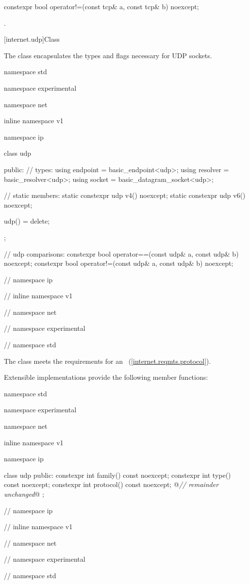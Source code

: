 \begin{itemdecl}
constexpr bool operator!=(const tcp& a, const tcp& b) noexcept;
\end{itemdecl}

\begin{itemdescr}
\pnum
\returns {}.
\end{itemdescr}




%
[internet.udp]{Class }

\pnum
The class  encapsulates the types and flags necessary for UDP sockets.

\begin{codeblock}
namespace std {
namespace experimental {
namespace net {
inline namespace v1 {
namespace ip {

  class udp
  {
  public:
    // types:
    using endpoint = basic_endpoint<udp>;
    using resolver = basic_resolver<udp>;
    using socket = basic_datagram_socket<udp>;

    // static members:
    static constexpr udp v4() noexcept;
    static constexpr udp v6() noexcept;

    udp() = delete;
  };

  // udp comparisons:
  constexpr bool operator==(const udp& a, const udp& b) noexcept;
  constexpr bool operator!=(const udp& a, const udp& b) noexcept;

} // namespace ip
} // inline namespace v1
} // namespace net
} // namespace experimental
} // namespace std
\end{codeblock}

\pnum
The  class meets the requirements for an ~(\ref{internet.reqmts.protocol}).

%
\pnum
 Extensible implementations provide the following member functions:

\begin{codeblock}
namespace std {
namespace experimental {
namespace net {
inline namespace v1 {
namespace ip {

  class udp
  {
  public:
    constexpr int family() const noexcept;
    constexpr int type() const noexcept;
    constexpr int protocol() const noexcept;
    @\textit{// remainder unchanged}@
  };

} // namespace ip
} // inline namespace v1
} // namespace net
} // namespace experimental
} // namespace std
\end{codeblock}

